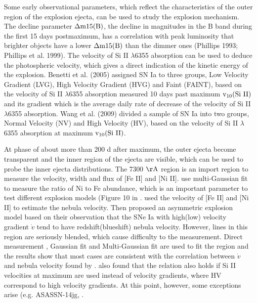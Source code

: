 \documentclass[twocolumn]{aastex631}
\begin{document}
Some early observational parameters, which reflect the characteristics of the outer region of the explosion ejecta, can be used to study the explosion mechanism. The decline parameter $\rm {\Delta}m15(B)$, the decline in magnitudes in the B band during the first 15 days postmaximum, has a correlation with peak luminosity that brighter objects have a lower $\rm {\Delta}m15(B)$ than the dimmer ones (Phillips 1993; Phillips et al. 1999). The velocity of Si II $\lambda$6355 absorption can be used to deduce the photospheric velocity, which gives a direct indication of the kinetic energy of the explosion. Benetti et al. (2005) assigned SN Ia to three groups, Low Velocity Gradient (LVG), High Velocity Gradient (HVG) and Faint (FAINT), based on the velocity of Si II $\lambda$6355 absorption measured 10 days past maximum $\rm v_{10}(Si\ II)$ and its gradient which is the average daily rate of decrease of the velocity of Si II $\lambda$6355 absorption. Wang et al. (2009) divided a sample of SN Ia into two groups, Normal Velocity (NV) and High Velocity (HV), based on the velocity of Si II $\lambda$6355 absorption at maximum $\rm v_{10}(Si\ II)$.

At phase of about more than 200 d after maximum, the outer ejecta become transparent and the inner region of the ejecta are visible, which can be used to probe the inner ejecta distributions. The 7300 $\rm \AA$ region is an import region to measure the velocity, width and flux of [Fe II] and [Ni II]. \citealt{2018MNRAS.477.3567M} use multi-Gaussian fit to measure the ratio of Ni to Fe abundance, which is an important parameter to test different explosion models (Figure 10 in \citealt{2018MNRAS.477.3567M}. \citealt{2010ApJ...708.1703M} used the velocity of [Fe II] and [Ni II] to estimate the nebula velocity. Then \citealt{2010Natur.466...82M} proposed an asymmetric explosion model based on their observation that the SNe Ia with high(low) velocity gradient $\dot{v}$ tend to have redshift(blueshift) nebula velocity. However, lines in this region are seriously blended, which cause difficulty to the measurement. Direct measurement \citep{2013MNRAS.430.1030S}, Gaussian fit \citep{2017MNRAS.472.3437G} and Multi-Gaussian fit \citep{2013MNRAS.429.1156S} are used to fit the region and the results show that most cases are consistent with the correlation between $\dot{v}$ and nebula velocity found by \citet{2013MNRAS.429.1156S}. \citep{2013MNRAS.430.1030S} also found that the relation also holds if Si II velocities at maximum are used instead of velocity gradients, where HV correspond to high velocity gradients. At this point, however, some exceptions arise (e.g. ASASSN-14jg, \citealt{2017MNRAS.472.3437G}.
\end{document}
